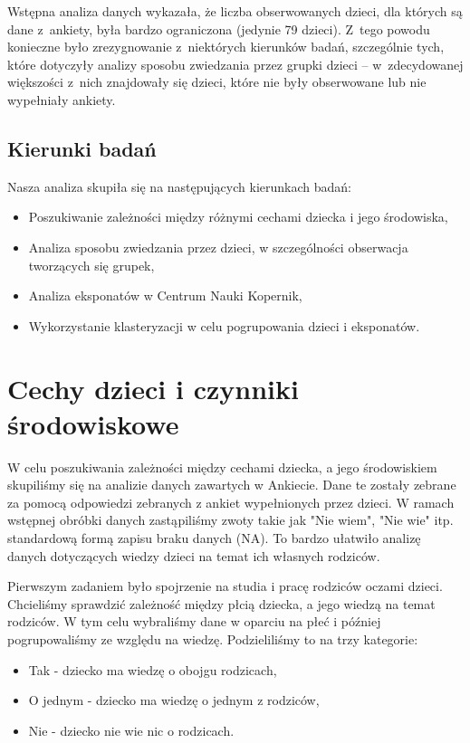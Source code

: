 \documentclass[conference]{IEEEtran}
\begin{document}
Wstępna analiza danych wykazała, że liczba obserwowanych dzieci, dla których są dane z~ankiety, była bardzo ograniczona (jedynie 79 dzieci). Z~tego powodu konieczne było zrezygnowanie z~niektórych kierunków badań, szczególnie tych, które dotyczyły analizy sposobu zwiedzania przez grupki dzieci -- w~zdecydowanej większości z~nich znajdowały się dzieci, które nie były obserwowane lub nie wypełniały ankiety.
\subsection{Kierunki badań}
Nasza analiza skupiła się na następujących kierunkach badań:
\begin{itemize}
\item Poszukiwanie zależności między różnymi cechami dziecka i jego środowiska,
\item Analiza sposobu zwiedzania przez dzieci, w szczególności obserwacja tworzących się grupek,
\item Analiza eksponatów w Centrum Nauki Kopernik,
\item Wykorzystanie klasteryzacji w celu pogrupowania dzieci i eksponatów.
\end{itemize}

\section{Cechy dzieci i czynniki środowiskowe}
W celu poszukiwania zależności między cechami dziecka, a jego środowiskiem skupiliśmy się na analizie danych zawartych w Ankiecie. Dane te zostały zebrane za pomocą odpowiedzi zebranych z ankiet wypełnionych przez dzieci. W ramach wstępnej obróbki danych zastąpiliśmy zwoty takie jak "Nie wiem", "Nie wie" itp. standardową formą zapisu braku danych (NA). To bardzo ułatwiło analizę danych dotyczących wiedzy dzieci na temat ich własnych rodziców.

Pierwszym zadaniem było spojrzenie na studia i pracę rodziców oczami dzieci. Chcieliśmy sprawdzić zależność między płcią dziecka, a jego wiedzą na temat rodziców. W tym celu wybraliśmy dane w oparciu na płeć i później pogrupowaliśmy ze względu na wiedzę. Podzieliliśmy to na trzy kategorie:

\begin{itemize}
	\item Tak - dziecko ma wiedzę o obojgu rodzicach,
	\item O jednym - dziecko ma wiedzę o jednym z rodziców,
	\item Nie - dziecko nie wie nic o rodzicach.
\end{itemize}
\end{document}
